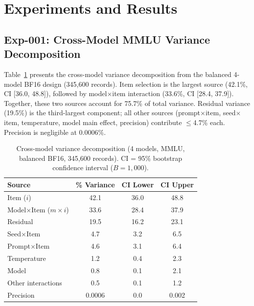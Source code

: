 \documentclass[letterpaper]{article}
\begin{document}
\section{Experiments and Results}

\subsection{Exp-001: Cross-Model MMLU Variance Decomposition}
\label{sec:exp001}

Table~\ref{tab:cross_model_decomp} presents the cross-model variance decomposition from the balanced 4-model BF16 design (345,600 records).
Item selection is the largest source (42.1\%, CI [36.0, 48.8]), followed by model$\times$item interaction (33.6\%, CI [28.4, 37.9]).
Together, these two sources account for 75.7\% of total variance.
Residual variance (19.5\%) is the third-largest component; all other sources (prompt$\times$item, seed$\times$item, temperature, model main effect, precision) contribute $\leq$4.7\% each.
Precision is negligible at 0.0006\%.

\begin{table}[t]
\centering
\caption{Cross-model variance decomposition (4 models, MMLU, balanced BF16, 345,600 records). CI = 95\% bootstrap confidence interval ($B=1{,}000$).}
\label{tab:cross_model_decomp}
\begin{tabular}{lccc}
\toprule
Source & \% Variance & CI Lower & CI Upper \\
\midrule
Item ($i$)                  & 42.1 & 36.0 & 48.8 \\
Model$\times$Item ($m \times i$) & 33.6 & 28.4 & 37.9 \\
Residual                    & 19.5 & 16.2 & 23.1 \\
Seed$\times$Item            & 4.7  & 3.2  & 6.5  \\
Prompt$\times$Item          & 4.6  & 3.1  & 6.4  \\
Temperature                 & 1.2  & 0.4  & 2.3  \\
Model                       & 0.8  & 0.1  & 2.1  \\
Other interactions          & 0.5  & 0.1  & 1.2  \\
Precision                   & 0.0006 & 0.0 & 0.002 \\
\bottomrule
\end{tabular}
\end{table}
\end{document}
